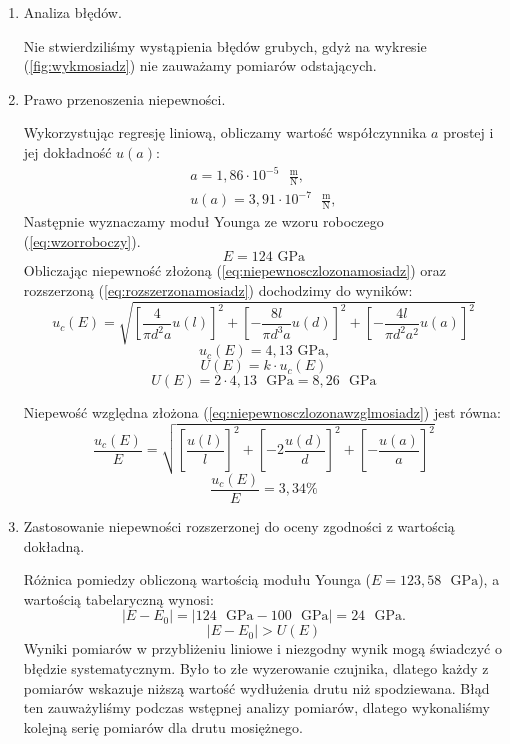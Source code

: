 \documentclass [a4paper,11pt]{article}
\begin{document}
	\begin{enumerate}[label=\alph*)]
		
		\item Analiza błędów.
		
		Nie stwierdziliśmy wystąpienia błędów grubych, gdyż na wykresie (\ref{fig:wykmosiadz}) nie zauważamy pomiarów odstających.
		
		\item Prawo przenoszenia niepewności.
		
		Wykorzystując regresję liniową, obliczamy wartość współczynnika $a$ prostej i  jej dokładność $u(a)$:
		\begin{align}
		a = 1,86 \cdot 10^{-5} \text{ }\mathrm{\frac{m}{N}},\label{a} \\
		u(a) = 3,91 \cdot 10^{-7} \text{ }\mathrm{\frac{m}{N}},
		\end{align}
		Następnie wyznaczamy moduł Younga ze wzoru roboczego (\ref{eq:wzorroboczy}).
		$$ E = 124 \text{ GPa} $$
		Obliczając niepewność złożoną (\ref{eq:niepewnosczlozonamosiadz}) oraz rozszerzoną (\ref{eq:rozszerzonamosiadz}) dochodzimy do wyników: 
		\begin{equation}
		\label{eq:niepewnosczlozonamosiadz}
		u_c(E) = \sqrt{ \left[ \frac{4}{\pi d^2a}u(l) \right]^2 + \left[ -\frac{8l}{\pi d^3 a}u(d) \right]^2 + \left[ -\frac{4l}{\pi d^2 a^2}u(a) \right]^2}
		\end{equation}
		$$ u_c(E) = 4,13 \text{ GPa,} $$
		\begin{equation}
		\label{eq:rozszerzonamosiadz}
		U(E) = k\cdot u_c(E)
		\end{equation}
		$$ U(E) = 2 \cdot 4,13 \text{ }\mathrm{GPa} = 8,26 \text{ }\mathrm{GPa} $$
		
		Niepewość względna złożona (\ref{eq:niepewnosczlozonawzglmosiadz}) jest równa:
		\begin{equation}
		\label{eq:niepewnosczlozonawzglmosiadz}
		\frac{u_c(E)}{E} = \sqrt{ \left[ \frac{u(l)}{l} \right]^2 + \left[ -2\frac{u(d)}{d} \right]^2 + \left[ -\frac{u(a)}{a} \right]^2}
		\end{equation}
		$$ \frac{u_c(E)}{E} = 3,34\% $$
		
		\item Zastosowanie niepewności rozszerzonej do oceny zgodności z wartością dokładną.
		
		Różnica pomiedzy obliczoną wartością modułu Younga ($E=123,58  \text{ }\mathrm{GPa}$), a wartością tabelaryczną wynosi:
		\begin{equation}
		\label{eq:roznicamosiadz}
		|E - E_0| = \left|124 \text{ }\mathrm{GPa} - 100 \text{ }\mathrm{GPa}\right| = 24 \text{ }\mathrm{GPa}.
		\end{equation}
		$$
		|E - E_0| > U(E)
		$$
		Wyniki pomiarów w przybliżeniu liniowe i niezgodny wynik mogą świadczyć o błędzie systematycznym. Było to złe wyzerowanie czujnika, dlatego każdy z pomiarów wskazuje niższą wartość wydłużenia drutu niż spodziewana. Błąd ten zauważyliśmy podczas wstępnej analizy pomiarów, dlatego wykonaliśmy kolejną serię pomiarów dla drutu mosiężnego.
	\end{enumerate}
\end{document}
